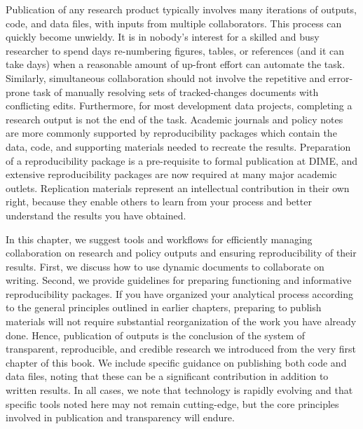 
\begin{fullwidth}
Publication of any research product typically involves many iterations of
outputs, code, and data files, with inputs from multiple collaborators.
This process can quickly become unwieldy.
It is in nobody's interest for a skilled and busy researcher
to spend days re-numbering figures, tables, or references (and it can take days)
when a reasonable amount of up-front effort can automate the task.
Similarly, simultaneous collaboration should not involve
the repetitive and error-prone task of manually resolving
sets of tracked-changes documents with conflicting edits.
Furthermore, for most development data projects,
completing a research output is not the end of the task.
Academic journals and policy notes are more commonly supported by
reproducibility packages which contain the data, code, and supporting materials
needed to recreate the results.
Preparation of a reproducibility package is a pre-requisite
to formal publication at DIME,
and extensive reproducibility packages are now required at many major academic outlets.
Replication materials represent an intellectual contribution in their own right,
because they enable others to learn from your process
and better understand the results you have obtained.

In this chapter, we suggest tools and workflows for
efficiently managing collaboration on research and policy outputs
and ensuring reproducibility of their results.
First, we discuss how to use dynamic documents to collaborate on writing.
Second, we provide guidelines for preparing
functioning and informative reproducibility packages.
If you have organized your analytical process
according to the general principles outlined in earlier chapters,
preparing to publish materials will not require
substantial reorganization of the work you have already done.
Hence, publication of outputs is the conclusion of the system
of transparent, reproducible, and credible research we introduced
from the very first chapter of this book.
We include specific guidance on publishing both code and data files,
noting that these can be a significant contribution in addition to written results.
In all cases, we note that technology is rapidly evolving
and that specific tools noted here may not remain cutting-edge,
but the core principles involved in publication and transparency will endure.
\end{fullwidth}


